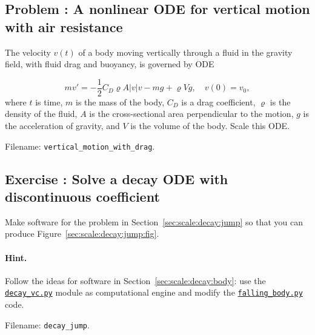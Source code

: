 \documentclass[graybox,envcountchap,sectrefs,final]{svmonodo}
\newcounter{doconce:movie:counter}
\newenvironment{doconceexercise}{}{}
\newcounter{doconceexercisecounter}
\begin{document}
\begin{doconceexercise}

\subsection*{Problem \thedoconceexercisecounter: A nonlinear ODE for vertical motion with air resistance}

\label{sec:scale:exer:ball_y_wdrag}

The velocity $v(t)$
of a body moving vertically through a fluid in the gravity field,
with fluid drag and buoyancy, is governed by ODE

\[ mv' = -\frac{1}{2}C_D\varrho A |v|v - mg + \varrho V g,\quad v(0)=v_0,\]
where $t$ is time, $m$ is the mass of the body, $C_D$ is a drag coefficient,
$\varrho$ is the density of the fluid, $A$ is the cross-sectional area
perpendicular to the motion, $g$ is the acceleration of gravity,
and $V$ is the volume of the body. Scale this ODE.


\noindent Filename: \Verb!vertical_motion_with_drag!.

\end{doconceexercise}




\begin{doconceexercise}

\subsection*{Exercise \thedoconceexercisecounter: Solve a decay ODE with discontinuous coefficient}

\label{sec:scale:exer:decay:jump}

Make software for the problem in Section~\ref{sec:scale:decay:jump}
so that you can produce Figure~\ref{sec:scale:decay:jump:fig}.


\paragraph{Hint.}
Follow the ideas for software in Section~\ref{sec:scale:decay:body}: use the
\href{{http://tinyurl.com/o8pb3yy/decay_vc.py}}{\nolinkurl{decay_vc.py}} module as computational
engine and modify the
\href{{http://tinyurl.com/o8pb3yy/falling_body.py}}{\nolinkurl{falling_body.py}} code.



\noindent Filename: \Verb!decay_jump!.

\end{doconceexercise}
\end{document}
